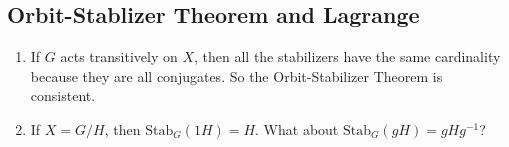 \documentclass[11pt]{article}
\newcommand{\0}{\emptyset}
\begin{document}
\subsection*{Orbit-Stablizer Theorem and Lagrange}
\label{sec:orgdb93a73}
\begin{enumerate}
\item If \(G\) acts transitively on \(X\), then all the stabilizers have the same cardinality because they are all conjugates. So the Orbit-Stabilizer Theorem is consistent.\\[0pt]
\item If \(X=G/H\), then \(\text{Stab}_{G}(1H)=H\). What about \(\text{Stab}_{G}(gH)=gHg^{-1}\)?\\[0pt]
\end{enumerate}
\end{document}
